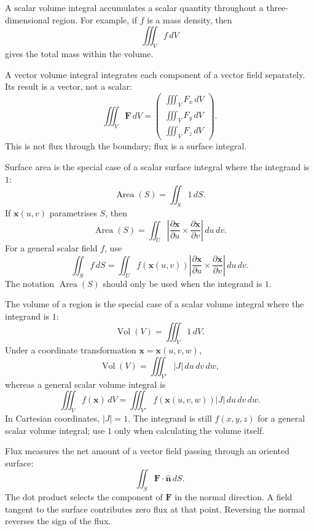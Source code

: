 \begin{blackbox}
  A scalar volume integral accumulates a scalar quantity throughout a three-dimensional region. For example, if $f$ is a mass density, then
  \[
    \iiint_V f\,dV
  \]
  gives the total mass within the volume.

  A vector volume integral integrates each component of a vector field separately. Its result is a vector, not a scalar:
  \[
    \iiint_V \mathbf{F}\,dV
    =
    \begin{pmatrix}
      \iiint_V F_x\,dV\\
      \iiint_V F_y\,dV\\
      \iiint_V F_z\,dV
    \end{pmatrix}.
  \]
  This is not flux through the boundary; flux is a surface integral.
\end{blackbox}

\begin{blackbox}
  Surface area is the special case of a scalar surface integral where the integrand is $1$:
  \[
    \operatorname{Area}(S)=\iint_S 1\,dS.
  \]
  If $\mathbf{x}(u,v)$ parametrises $S$, then
  \[
    \operatorname{Area}(S)
    =\iint_U
    \left|\frac{\partial\mathbf{x}}{\partial u}
    \times
    \frac{\partial\mathbf{x}}{\partial v}\right|\,du\,dv.
  \]
  For a general scalar field $f$, use
  \[
    \iint_S f\,dS
    =\iint_U f(\mathbf{x}(u,v))
    \left|\frac{\partial\mathbf{x}}{\partial u}
    \times
    \frac{\partial\mathbf{x}}{\partial v}\right|\,du\,dv.
  \]
  The notation $\operatorname{Area}(S)$ should only be used when the integrand is $1$.
\end{blackbox}

\begin{blackbox}
  The volume of a region is the special case of a scalar volume integral where the integrand is $1$:
  \[
    \operatorname{Vol}(V)=\iiint_V 1\,dV.
  \]
  Under a coordinate transformation $\mathbf{x}=\mathbf{x}(u,v,w)$,
  \[
    \operatorname{Vol}(V)
    =\iiint_{V'} |J|\,du\,dv\,dw,
  \]
  whereas a general scalar volume integral is
  \[
    \iiint_V f(\mathbf{x})\,dV
    =\iiint_{V'} f(\mathbf{x}(u,v,w))|J|\,du\,dv\,dw.
  \]
  In Cartesian coordinates, $|J|=1$. The integrand is still $f(x,y,z)$ for a general scalar volume integral; use $1$ only when calculating the volume itself.
\end{blackbox}

\begin{blackbox}
  Flux measures the net amount of a vector field passing through an oriented surface:
  \[
    \iint_S \mathbf{F}\cdot\hat{\mathbf{n}}\,dS.
  \]
  The dot product selects the component of $\mathbf{F}$ in the normal direction. A field tangent to the surface contributes zero flux at that point. Reversing the normal reverses the sign of the flux.
\end{blackbox}

